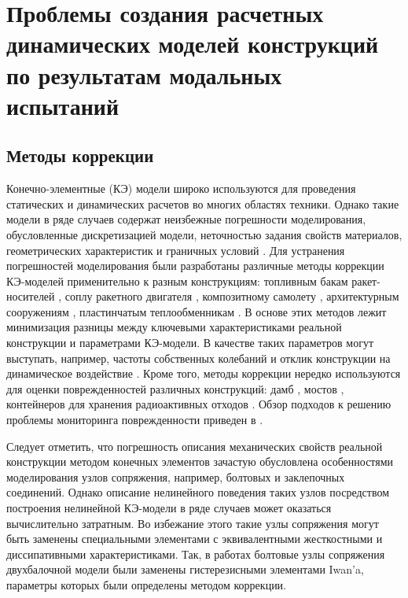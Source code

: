 \chapter{Проблемы создания расчетных динамических моделей конструкций по результатам модальных испытаний}

\section{Методы коррекции} 

Конечно-элементные (КЭ) модели широко используются для проведения статических и динамических расчетов во многих областях техники. Однако такие модели в ряде случаев содержат неизбежные погрешности моделирования, обусловленные дискретизацией модели, неточностью задания свойств материалов, геометрических характеристик и граничных условий \cite{lib:modelUpdating:Bartilson}. Для устранения погрешностей моделирования были разработаны различные методы коррекции КЭ-моделей применительно к разным конструкциям: топливным бакам ракет-носителей \cite{lib:modelUpdating:Li&Tian}, соплу ракетного двигателя \cite{lib:modelUpdating:Yan&Li}, композитному самолету \cite{lib:modelUpdating:Zhao&Gupta}, архитектурным сооружениям \cite{lib:modelUpdating:Girardi&Padovani}, пластинчатым теплообменникам \cite{lib:modelUpdating:Guo&Wang}. В основе этих методов лежит минимизация разницы между ключевыми характеристиками реальной конструкции и параметрами КЭ-модели. В качестве таких параметров могут выступать, например, частоты собственных колебаний и отклик конструкции на динамическое воздействие \cite{lib:modelUpdating:Petersen&Oiseth}. Кроме того, методы коррекции нередко используются для оценки поврежденностей различных конструкций: дамб \cite{lib:modelUpdating:Bayraktar&Sevim}, мостов \cite{lib:modelUpdating:Cong&Thoi, lib:modelUpdating:Polanco}, контейнеров для хранения радиоактивных отходов \cite{lib:modelUpdating:Eiras}. Обзор подходов к решению проблемы мониторинга поврежденности приведен в \cite{lib:modelUpdating:Simoen}. 

Следует отметить, что погрешность описания механических свойств реальной конструкции методом конечных элементов зачастую обусловлена особенностями моделирования узлов сопряжения, например, болтовых и заклепочных соединений. Однако описание нелинейного поведения таких узлов посредством построения нелинейной КЭ-модели в ряде случаев может оказаться вычислительно затратным. Во избежание этого такие узлы сопряжения могут быть заменены специальными элементами с эквивалентными жесткостными и диссипативными характеристиками. Так, в работах \cite{lib:modelUpdating:Lacayo, lib:modelUpdating:Yuan} болтовые узлы сопряжения двухбалочной модели были заменены гистерезисными элементами Iwan’a, параметры которых были определены методом коррекции. 

